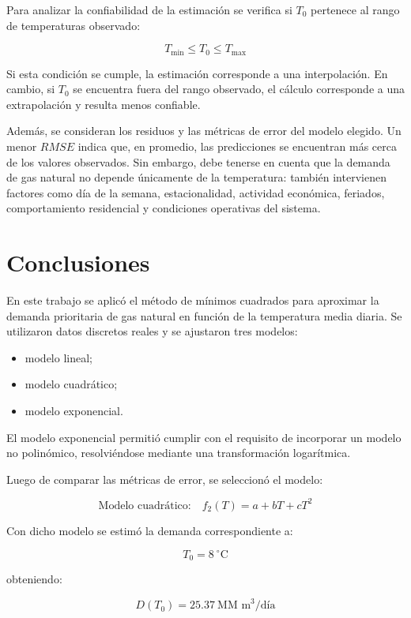\documentclass[12pt,a4paper]{article}
\newcommand{\unidadDemanda}{\text{MM m}^3/\text{día}}
\newcommand{\unidadTemp}{^\circ\text{C}}
\begin{document}
Para analizar la confiabilidad de la estimación se verifica si \(T_0\) pertenece al rango de temperaturas observado:

\[
    T_{\min} \leq T_0 \leq T_{\max}
\]

Si esta condición se cumple, la estimación corresponde a una interpolación. En cambio, si \(T_0\) se encuentra fuera del rango observado, el cálculo corresponde a una extrapolación y resulta menos confiable.

Además, se consideran los residuos y las métricas de error del modelo elegido. Un menor \(RMSE\) indica que, en promedio, las predicciones se encuentran más cerca de los valores observados. Sin embargo, debe tenerse en cuenta que la demanda de gas natural no depende únicamente de la temperatura: también intervienen factores como día de la semana, estacionalidad, actividad económica, feriados, comportamiento residencial y condiciones operativas del sistema.

\section{Conclusiones}

En este trabajo se aplicó el método de mínimos cuadrados para aproximar la demanda prioritaria de gas natural en función de la temperatura media diaria. Se utilizaron datos discretos reales y se ajustaron tres modelos:

\begin{itemize}
    \item modelo lineal;
    \item modelo cuadrático;
    \item modelo exponencial.
\end{itemize}

El modelo exponencial permitió cumplir con el requisito de incorporar un modelo no polinómico, resolviéndose mediante una transformación logarítmica.

Luego de comparar las métricas de error, se seleccionó el modelo:

\[
    \boxed{\text{Modelo cuadrático:}\quad f_2(T)=a+bT+cT^2}
\]

Con dicho modelo se estimó la demanda correspondiente a:

\[
    T_0 = \boxed{8} \ \unidadTemp
\]

obteniendo:

\[
    D(T_0)=\boxed{\num{25.37}} \ \unidadDemanda
\]
\end{document}
